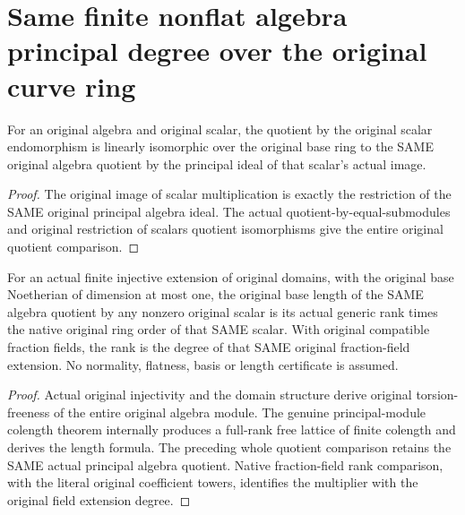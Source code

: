 \section{Same finite nonflat algebra principal degree over the original curve ring}

\begin{definition}
\label{def:fc-finite-algebra-scalar-quotient}
\leanok
{}
For an original algebra and original scalar, the quotient by the
original scalar endomorphism is linearly isomorphic over the
original base ring to the SAME original algebra quotient by the
principal ideal of that scalar's actual image.
\end{definition}
\begin{proof}
The original image of scalar multiplication is exactly the
restriction of the SAME original principal algebra ideal. The
actual quotient-by-equal-submodules and original restriction of
scalars quotient isomorphisms give the entire original quotient
comparison.
\end{proof}

\begin{theorem}
\label{thm:fc-finite-algebra-principal-degree}
\leanok
{}
For an actual finite injective extension of original domains, with
the original base Noetherian of dimension at most one, the original
base length of the SAME algebra quotient by any nonzero original
scalar is its actual generic rank times the native original ring
order of that SAME scalar. With original compatible fraction fields,
the rank is the degree of that SAME original fraction-field
extension. No normality, flatness, basis or length certificate is
assumed.
\end{theorem}
\begin{proof}
Actual original injectivity and the domain structure derive original
torsion-freeness of the entire original algebra module. The genuine
principal-module colength theorem internally produces a full-rank
free lattice of finite colength and derives the length formula.
The preceding whole quotient comparison retains the SAME actual
principal algebra quotient. Native fraction-field rank comparison,
with the literal original coefficient towers, identifies the
multiplier with the original field extension degree.
\end{proof}

